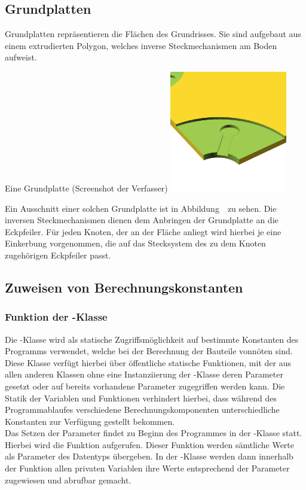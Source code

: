 \subsection{Grundplatten}
Grundplatten repräsentieren die Flächen des Grundrisses.
Sie sind aufgebaut aus einem extrudierten Polygon, welches inverse Steckmechanismen am Boden aufweist.
\begin{Bild}{Eine Grundplatte (Screenshot der Verfasser)}
	\includegraphics[height=200px]{Bilder/Untereinheit_GP}
\end{Bild}
Ein Ausschnitt einer solchen Grundplatte ist in Abbildung~\thebildnr\ zu sehen.
Die inversen Steckmechanismen dienen dem Anbringen der Grundplatte an die Eckpfeiler.
Für jeden Knoten, der an der Fläche anliegt wird hierbei je eine Einkerbung vorgenommen, die auf das Stecksystem des zu dem Knoten zugehörigen Eckpfeiler passt.

\subsection{Zuweisen von Berechnungskonstanten}
\subsubsection{Funktion der -Klasse}
Die -Klasse wird als statische Zugriffsmöglichkeit auf bestimmte Konstanten des Programms verwendet, welche bei der Berechnung der Bauteile vonnöten sind.
Diese Klasse verfügt hierbei über öffentliche statische Funktionen, mit der aus allen anderen Klassen ohne eine Instanziierung der -Klasse deren Parameter gesetzt oder auf bereits vorhandene Parameter zugegriffen werden kann.
Die Statik der Variablen und Funktionen verhindert hierbei, dass während des Programmablaufes verschiedene  Berechnungskomponenten unterschiedliche Konstanten zur Verfügung gestellt bekommen. \\
Das Setzen der Parameter findet zu Beginn des Programmes in der -Klasse statt.
Hierbei wird die Funktion  aufgerufen.
Dieser Funktion werden sämtliche Werte als Parameter des Datentyps  übergeben.
In der -Klasse werden dann innerhalb der Funktion allen privaten Variablen ihre Werte entsprechend der Parameter zugewiesen und abrufbar gemacht.\\

